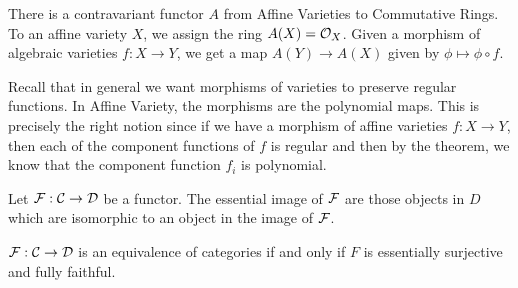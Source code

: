 \documentclass[12pt]{article}
\begin{document}
\begin{lemma}
There is a contravariant functor $A$ from Affine Varieties to Commutative Rings. To an affine variety $X$, we assign the ring $A(X) = \mathcal{O}_X$. Given a morphism of algebraic varieties $f:X\to Y$, we get a map $A(Y)\to A(X)$ given by $\phi \mapsto \phi\circ f$.
\end{lemma}
\begin{remark}
Recall that in general we want morphisms of varieties to preserve regular functions. In Affine Variety, the morphisms are the polynomial maps. This is precisely the right notion since if we have a morphism of affine varieties $f:X\to Y$, then each of the component functions of $f$ is regular and then by the theorem, we know that the component function $f_i$ is polynomial.
\end{remark}

\begin{definition}
Let $\mathcal{F}:\mathcal{C}\to \mathcal{D}$ be a functor. The essential image of $\mathcal{F}$ are those objects in $D$ which are isomorphic to an object in the image of $\mathcal{F}$.
\end{definition}

\begin{fact}
$\mathcal{F}:\mathcal{C}\to \mathcal{D}$ is an equivalence of categories if and only if $F$ is essentially surjective and fully faithful.
\end{fact}
\end{document}
